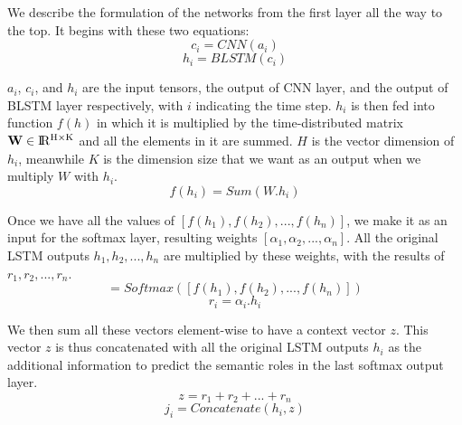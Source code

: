 We describe the formulation of the networks from the first layer all the way to the top. It begins with these two equations:
\begin{equation}
c_{i} = CNN(a_{i})
\end{equation}
\begin{equation}
h_{i} = BLSTM(c_{i})
\end{equation}

\textbf{$a_{i}$}, \textbf{$c_{i}$}, and \textbf{$h_{i}$} are the input tensors, the output of CNN layer, and the output of BLSTM layer respectively, with $i$ indicating the time step. $h_{i}$ is then fed into function $f(h)$ in which it is multiplied by the time-distributed matrix $\textbf{W} \in {\rm I\!R^{H \times K}}$ and all the elements in it are summed. $H$ is the vector dimension of $h_{i}$, meanwhile $K$ is the dimension size that we want as an output when we multiply \textbf{$W$} with $h_{i}$.
\begin{equation}
\label{sum_weight}
f(h_{i}) = Sum(W.h_{i})
\end{equation}

Once we have all the values of $[f(h_{1}), f(h_{2}), ..., f(h_{n})]$, we make it as an input for the softmax layer, resulting weights $[\alpha_{1}, \alpha_{2}, ..., \alpha_{n}]$. All the original LSTM outputs $h_{1}, h_{2}, ..., h_{n}$ are multiplied by these weights, with the results of $r_{1}, r_{2}, ..., r_{n}$.
\begin{equation}
[\alpha_{1}, \alpha_{2}, ..., \alpha_{n}] = Softmax([f(h_{1}), f(h_{2}), ..., f(h_{n})])
\end{equation}
\begin{equation}
r_{i} = \alpha_{i}.h_{i}
\end{equation}

We then sum all these vectors element-wise to have a context vector $z$. This vector $z$ is thus concatenated with all the original LSTM outputs $h_{i}$ as the additional information to predict the semantic roles in the last softmax output layer.
\begin{equation}
z = r_{1} + r_{2} + ... + r_{n}
\end{equation}
\begin{equation}
j_{i} = Concatenate(h_{i}, z)
\end{equation}
  
